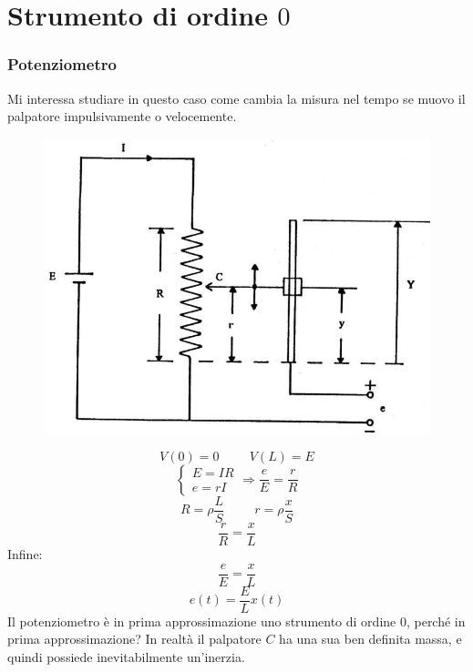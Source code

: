 \documentclass[a4paper, 15pt]{article}
\begin{document}
\section{Strumento di ordine $0$}
\subsubsection{Potenziometro}
\begin{adjustwidth}{2in}{}	

	Mi interessa studiare in questo caso come cambia la misura nel tempo se muovo il palpatore impulsivamente o velocemente.	
	\begin{figure}[H]
		\centering
		\includegraphics[width=0.4\linewidth]{fig/imag}

		\label{fig:imag}
	\end{figure}	
	\[V(0) = 0 \hspace{1cm} V(L) = E\]
	\[ \begin{cases}
		E = IR \\
		e = rI
	\end{cases} \Rightarrow \dfrac{e}{E} = \dfrac{r}{R} \]
	\[ R = \rho \dfrac{L}{S} \hspace{1cm} r = \rho \dfrac{x}{S}  \]
	\[ \dfrac{r}{R} = \dfrac{x}{L}\]
	Infine: 
	\[ \dfrac{e}{E} = \dfrac{x}{L} \]
	\[ e(t) = \dfrac{E}{L}x(t) \]
	Il potenziometro è in prima approssimazione uno strumento di ordine $0$, perché in prima approssimazione? In realtà il palpatore $C$ ha una sua ben definita massa, e quindi possiede inevitabilmente un'inerzia.  
\end{adjustwidth}
\newpage
\end{document}

